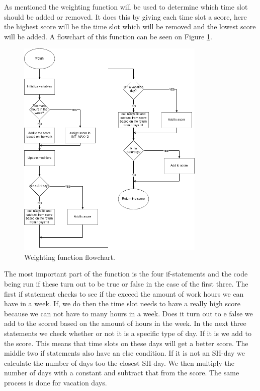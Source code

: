 As mentioned the weighting function will be used to determine which time slot should be added or removed. It does this by giving each time slot a score, here the highest score will be the time slot which will be removed and the lowest score will be added. A flowchart of this function can be seen on Figure \ref{fig:weighting_flow}.

\clearpage
\begin{figure}[ht!]
    \centering
    \includegraphics[width=0.8\textwidth]{media/Flowcharts/weight_flow.png}
    \caption{Weighting function flowchart.}
    \label{fig:weighting_flow}
\end{figure}

The most important part of the function is the four if-statements and the code being run if these turn out to be true or false in the case of the first three. The first if statement checks to see if the exceed the amount of work hours we can have in a week. If, we do then the time slot needs to have a really high score because we can not have to many hours in a week. Does it turn out to e false we add to the scored based on the amount of hours in the week. In the next three statements we check whether or not it is a specific type of day. If it is we add to the score. This means that time slots on these days will get a better score. The middle two if statements also have an else condition. If it is not an SH-day we calculate the number of days too the closest SH-day. We then multiply the number of days with a constant and subtract that from the score. The same process is done for vacation days. 

